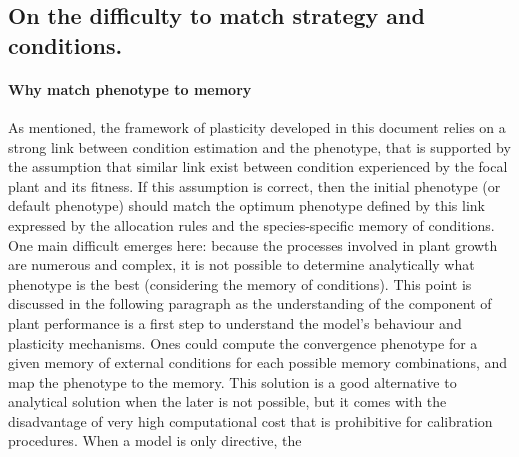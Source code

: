 

\subsection{On the difficulty to match strategy and conditions.}\label{subsection:match}

\paragraph{Why match phenotype to memory}

As mentioned, the framework of plasticity developed in this document relies on a strong link between condition estimation and the phenotype, that is supported by the assumption that similar link exist between condition experienced by the focal plant and its fitness.   If this assumption is correct, then the initial phenotype (or default phenotype) should match the optimum phenotype defined by this link expressed by the allocation rules and the species-specific memory of conditions. One main difficult emerges here: because the processes involved in plant growth are numerous and complex, it is not possible to determine analytically what phenotype is the best (considering the memory of conditions). This point is discussed in the following paragraph as the understanding of the component of plant performance is a first step to understand the model's behaviour and plasticity mechanisms. Ones could compute the convergence phenotype for a given memory of external conditions for each possible memory combinations, and map the phenotype to the memory.
This solution is a good alternative to analytical solution when the later is not possible, but it comes with the disadvantage of very high computational cost that is prohibitive for calibration procedures.
When a model is only directive, the 

